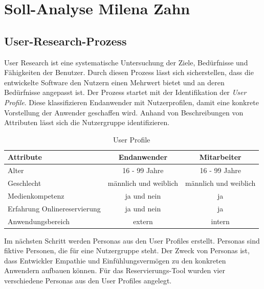 	\section[Soll-Analyse]{Soll-Analyse {\hfill \normalsize Milena Zahn}}
		
	 	\subsection{User-Research-Prozess} 
	 	User Research ist eine systematische Untersuchung der Ziele, Bedürfnisse und Fähigkeiten der Benutzer\autocite[Vgl.][S. 6]{Schumacher.2010}.
	 	Durch diesen Prozess lässt sich sicherstellen, dass die entwickelte Software den Nutzern einen Mehrwert bietet und an deren Bedürfnisse angepasst ist.
		Der Prozess startet mit der Identifikation der \textit{User Profile}. Diese klassifizieren Endanwender mit Nutzerprofilen, damit eine konkrete Vorstellung der Anwender geschaffen wird. Anhand von Beschreibungen von Attributen lässt sich die Nutzergruppe identifizieren.
		
		\begin{table}[H]
			\centering
			\begin{tabular}{p{} || c | c }
				\textbf{Attribute} & \textbf{Endanwender} & \textbf{Mitarbeiter} \\\toprule
				Alter &  16 - 99 Jahre &  16 - 99 Jahre \\
				Geschlecht &  männlich und weiblich &  männlich und weiblich  \\
				Medienkompetenz &  ja und nein &  ja  \\
				Erfahrung Onlinereservierung &  ja und nein &  ja  \\
				Anwendungsbereich &  extern &  intern  \\
			\end{tabular}
			\caption[User Profile]{\label{tab:tabelleUserProfile}User Profile }
		\end{table}
		
		Im nächsten Schritt werden Personas aus den User Profiles erstellt. Personas sind fiktive Personen, die für eine Nutzergruppe steht. Der Zweck von Personas ist, dass Entwickler Empathie und Einfühlungsvermögen zu den konkreten Anwendern aufbauen können. Für das Reservierungs-Tool wurden vier verschiedene Personas aus den User Profiles angelegt. 
		
